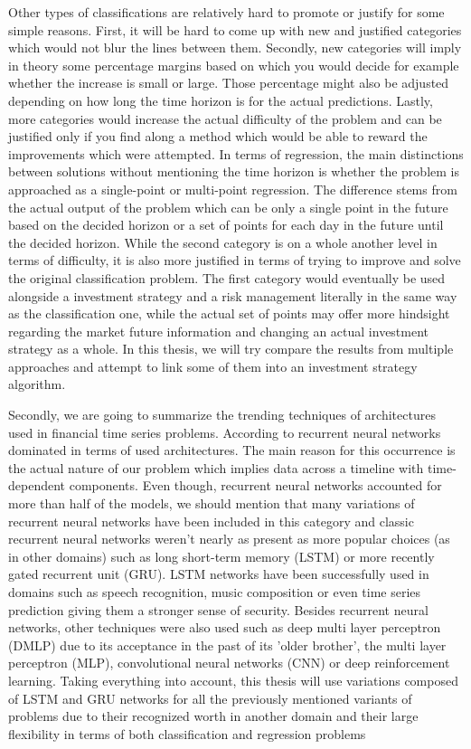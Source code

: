 Other types of classifications are relatively hard to promote or justify for some simple reasons. First, it will be hard to come up with new and justified categories which would not blur the lines between them. Secondly, new categories will imply in theory some percentage margins based on which you would decide for example whether the increase is small or large. Those percentage might also be adjusted depending on how long the time horizon is for the actual predictions. Lastly, more categories would increase the actual difficulty of the problem and can be justified only if you find along a method which would be able to reward the improvements which were attempted. In terms of regression, the main distinctions between solutions without mentioning the time horizon is whether the problem is approached as a single-point or multi-point regression. The difference stems from the actual output of the problem which can be only a single point in the future based on the decided horizon or a set of points for each day in the future until the decided horizon. While the second category is on a whole another level in terms of difficulty, it is also more justified in terms of trying to improve and solve the original classification problem. The first category would eventually be used alongside a investment strategy and a risk management literally in the same way as the classification one, while the actual set of points may offer more hindsight regarding the market future information and changing an actual investment strategy as a whole. In this thesis, we will try compare the results from multiple approaches and attempt to link some of them into an investment strategy algorithm.

\vspace{5mm}

Secondly, we are going to summarize the trending techniques of architectures used in financial time series problems. According to \cite{sezer2020financial} recurrent neural networks dominated in terms of used architectures. The main reason for this occurrence is the actual nature of our problem which implies data across a timeline with time-dependent components. Even though, recurrent neural networks accounted for more than half of the models, we should mention that many variations of recurrent neural networks have been included in this category and classic recurrent neural networks weren't nearly as present as more popular choices (as in other domains) such as long short-term memory (LSTM) or more recently gated recurrent unit (GRU). LSTM networks have been successfully used in domains such as speech recognition, music composition or even time series prediction giving them a stronger sense of security. Besides recurrent neural networks, other techniques were also used such as deep multi layer perceptron (DMLP) due to its acceptance in the past of its 'older brother', the multi layer perceptron (MLP), convolutional neural networks (CNN) or deep reinforcement learning. Taking everything into account, this thesis will use variations composed of LSTM and GRU networks for all the previously mentioned variants of problems due to their recognized worth in another domain and their large flexibility in terms of both classification and regression problems

